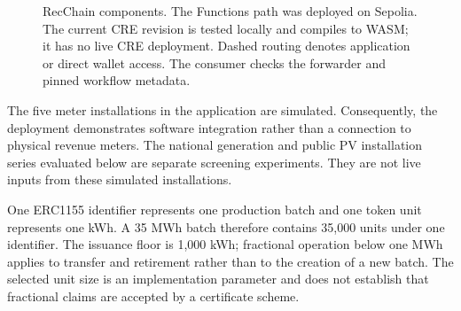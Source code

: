 \documentclass[11pt,a4paper]{article}
\begin{document}
\begin{figure}[tb]
\centering
{}
\caption{RecChain components. The Functions path was deployed on Sepolia. The current CRE revision is tested locally and compiles to WASM; it has no live CRE deployment. Dashed routing denotes application or direct wallet access. The consumer checks the forwarder and pinned workflow metadata.}\label{fig:architecture}
\end{figure}

The five meter installations in the application are simulated. Consequently, the deployment demonstrates software integration rather than a connection to physical revenue meters. The national generation and public PV installation series evaluated below are separate screening experiments. They are not live inputs from these simulated installations.



One ERC1155 identifier represents one production batch and one token unit represents one kWh. A 35 MWh batch therefore contains 35,000 units under one identifier. The issuance floor is 1,000 kWh; fractional operation below one MWh applies to transfer and retirement rather than to the creation of a new batch. The selected unit size is an implementation parameter and does not establish that fractional claims are accepted by a certificate scheme.
\end{document}
